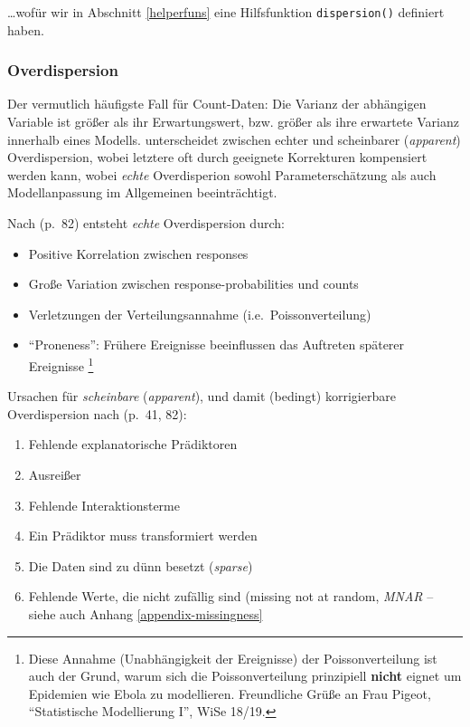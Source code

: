 \documentclass[ngerman,a4paper,]{scrartcl}
\providecommand{\tightlist}{%
  \setlength{\itemsep}{0pt}\setlength{\parskip}{0pt}}
\theoremstyle{definition}
\theoremstyle{definition}
\theoremstyle{definition}
\theoremstyle{remark}
\begin{document}
\ldots{}wofür wir in Abschnitt \ref{helperfuns} eine Hilfsfunktion \texttt{dispersion()} definiert haben.

\hypertarget{overdispersion}{%
\subsubsection{Overdispersion}\label{overdispersion}}

Der vermutlich häufigste Fall für Count-Daten: Die Varianz der abhängigen Variable ist größer als ihr Erwartungswert, bzw. größer als ihre erwartete Varianz innerhalb eines Modells.
\citet{hilbeModelingCountData2014} unterscheidet zwischen echter und scheinbarer (\emph{apparent}) Overdispersion, wobei letztere oft durch geeignete Korrekturen kompensiert werden kann, wobei \emph{echte} Overdisperion sowohl Parameterschätzung als auch Modellanpassung im Allgemeinen beeinträchtigt.

Nach \citet{hilbeModelingCountData2014} (p.~82) entsteht \emph{echte} Overdispersion durch:

\begin{itemize}
\tightlist
\item
  Positive Korrelation zwischen responses
\item
  Große Variation zwischen response-probabilities und counts
\item
  Verletzungen der Verteilungsannahme (i.e.~Poissonverteilung)
\item
  \enquote{Proneness}: Frühere Ereignisse beeinflussen das Auftreten späterer Ereignisse \footnote{Diese Annahme (Unabhängigkeit der Ereignisse) der Poissonverteilung ist auch der Grund, warum sich die Poissonverteilung prinzipiell \textbf{nicht} eignet um Epidemien wie Ebola zu modellieren. Freundliche Grüße an Frau Pigeot, \enquote{Statistische Modellierung I}, WiSe 18/19.}
\end{itemize}

Ursachen für \emph{scheinbare} (\emph{apparent}), und damit (bedingt) korrigierbare Overdispersion nach \citet{hilbeModelingCountData2014} (p.~41, 82):

\begin{enumerate}
\def\labelenumi{\arabic{enumi}.}
\tightlist
\item
  Fehlende explanatorische Prädiktoren
\item
  Ausreißer
\item
  Fehlende Interaktionsterme
\item
  Ein Prädiktor muss transformiert werden
\item
  Die Daten sind zu dünn besetzt (\emph{sparse})
\item
  Fehlende Werte, die nicht zufällig sind (missing not at random, \emph{MNAR} -- siehe auch Anhang \ref{appendix-missingness}
\end{enumerate}
\end{document}
